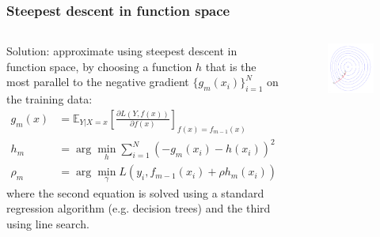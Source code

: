 \documentclass{beamer}
\begin{document}
\begin{frame}
  \frametitle{Steepest descent in function space}

 \begin{columns}
     \begin{column}{.75\textwidth}

         Solution: approximate using steepest descent in function space, by
             choosing a function $h$ that is the most parallel to the negative gradient
             $\{ g_m(x_i) \}_{i=1}^N$ on the training data:
             \begin{align*}
                 g_m(x) &= \mathbb{E}_{Y|X=x} \left[ \frac{\partial L(Y,f(x))}{\partial f(x)} \right]_{f(x) = f_{m-1}(x)} \\
                 h_m &= \arg \min_h \sum_{i=1}^N (-g_m(x_i) - h(x_i))^2 \\
                 \rho_m &= \arg \min_\gamma L(y_i, f_{m-1}(x_i) + \rho h_m(x_i))
             \end{align*}
             where the second equation is solved using a standard regression algorithm (e.g. decision trees)
             and the third using line search.

     \end{column}
     \begin{column}{.25\textwidth}
         \begin{figure}
            \centering
            \includegraphics[width=2.\textwidth]{figures/steepest.png}
         \end{figure}
     \end{column}
 \end{columns}

\end{frame}
\end{document}
